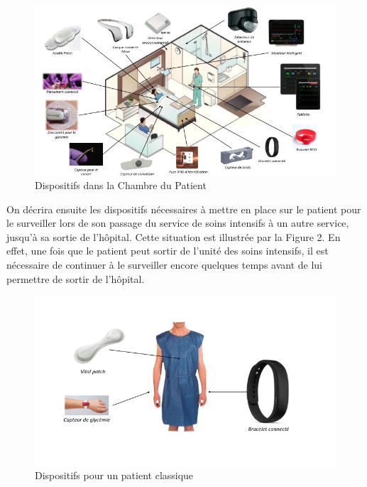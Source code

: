 \documentclass{article}
\begin{document}
\begin{figure}[h!]
	\hspace*{-3cm}
	\centering
	\includegraphics[width=1.5\textwidth]{Figure1.jpg}
	\caption{Dispositifs dans la Chambre du Patient}
	\label{fig:balance}
\end{figure}

On décrira ensuite les dispositifs nécessaires à mettre en place sur le patient pour le surveiller lors de son passage du service de soins intensifs à un autre service, jusqu’à sa sortie de l’hôpital. Cette situation est illustrée par la Figure 2. En effet, une fois que le patient peut sortir de l'unité des soins intensifs, il est nécessaire de continuer à le surveiller encore quelques temps avant de lui permettre de sortir de l’hôpital.
\\
\begin{figure}[h!]
	\hspace*{-1cm}
	\centering
	\includegraphics[width=1.2\textwidth]{Figure2.jpg}
	\caption{Dispositifs pour un patient classique}
	\label{fig:balance}
\end{figure}
\end{document}
